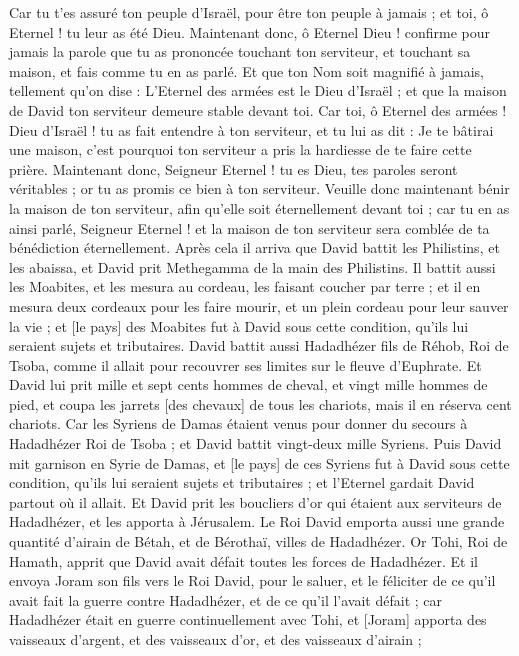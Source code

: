 \begin{multicols}{2}
Car tu t'es assuré ton peuple d'Israël, pour être ton peuple à jamais ; et toi, ô Eternel ! tu leur as été Dieu.
Maintenant donc, ô Eternel Dieu ! confirme pour jamais la parole que tu as prononcée touchant ton serviteur, et touchant sa maison, et fais comme tu en as parlé.
Et que ton Nom soit magnifié à jamais, tellement qu'on dise : L'Eternel des armées est le Dieu d'Israël ; et que la maison de David ton serviteur demeure stable devant toi.
Car toi, ô Eternel des armées ! Dieu d'Israël ! tu as fait entendre à ton serviteur, et tu lui as dit : Je te bâtirai une maison, c'est pourquoi ton serviteur a pris la hardiesse de te faire cette prière.
Maintenant donc, Seigneur Eternel ! tu es Dieu, tes paroles seront véritables ; or tu as promis ce bien à ton serviteur.
Veuille donc maintenant bénir la maison de ton serviteur, afin qu'elle soit éternellement devant toi ; car tu en as ainsi parlé, Seigneur Eternel ! et la maison de ton serviteur sera comblée de ta bénédiction éternellement.
\VerseOne{}Après cela il arriva que David battit les Philistins, et les abaissa, et David prit Methegamma de la main des Philistins.
Il battit aussi les Moabites, et les mesura au cordeau, les faisant coucher par terre ; et il en mesura deux cordeaux pour les faire mourir, et un plein cordeau pour leur sauver la vie ; et [le pays] des Moabites fut à David sous cette condition, qu'ils lui seraient sujets et tributaires.
David battit aussi Hadadhézer fils de Réhob, Roi de Tsoba, comme il allait pour recouvrer ses limites sur le fleuve d'Euphrate.
Et David lui prit mille et sept cents hommes de cheval, et vingt mille hommes de pied, et coupa les jarrets [des chevaux] de tous les chariots, mais il en réserva cent chariots.
Car les Syriens de Damas étaient venus pour donner du secours à Hadadhézer Roi de Tsoba ; et David battit vingt-deux mille Syriens.
Puis David mit garnison en Syrie de Damas, et [le pays] de ces Syriens fut à David sous cette condition, qu'ils lui seraient sujets et tributaires ; et l'Eternel gardait David partout où il allait.
Et David prit les boucliers d'or qui étaient aux serviteurs de Hadadhézer, et les apporta à Jérusalem.
Le Roi David emporta aussi une grande quantité d'airain de Bétah, et de Bérothaï, villes de Hadadhézer.
Or Tohi, Roi de Hamath, apprit que David avait défait toutes les forces de Hadadhézer.
Et il envoya Joram son fils vers le Roi David, pour le saluer, et le féliciter de ce qu'il avait fait la guerre contre Hadadhézer, et de ce qu'il l'avait défait ; car Hadadhézer était en guerre continuellement avec Tohi, et [Joram] apporta des vaisseaux d'argent, et des vaisseaux d'or, et des vaisseaux d'airain ;

\end{multicols}
